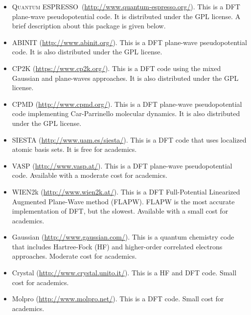 \documentclass[12pt]{article}
\def\QE{\textsc{Quantum ESPRESSO}\xspace}
\begin{document}
    \begin{itemize}

      \item 
      \QE\, (\href{http://www.quantum-espresso.org/}{http://www.quantum-espresso.org/}).
      This is a DFT plane-wave pseudopotential code. It is distributed under the GPL license. A brief description about this package is given below.

      \item
      ABINIT (\href{http://www.abinit.org/}{http://www.abinit.org/}).
      This is a DFT plane-wave pseudopotential code. It is also distributed under the GPL license.

      \item
      CP2K (\href{https://www.cp2k.org/}{https://www.cp2k.org/}).
      This is a DFT code using the mixed Gaussian and plane-waves approaches. It is also distributed under the GPL license.

      \item
      CPMD (\href{http://www.cpmd.org/}{http://www.cpmd.org/}).
      This is a DFT plane-wave pseudopotential code implementing
      Car-Parrinello molecular dynamics.
      It is also distributed under the GPL license.

      \item
      SIESTA (\href{http://www.uam.es/siesta/}{http://www.uam.es/siesta/}).
      This is a DFT code that uses localized atomic basis sets. 
      It is free for academics.

      \item
      VASP (\href{http://www.vasp.at/}{http://www.vasp.at/}).
      This is a DFT plane-wave pseudopotential code. 
      Available with a moderate cost for academics. %

      \item
      WIEN2k (\href{http://www.wien2k.at/}{http://www.wien2k.at/}).
      This is a DFT Full-Potential Linearized Augmented Plane-Wave method (FLAPW).
      FLAPW is the most accurate implementation of DFT, but the slowest.
      Available with  a small cost for academics. %

      \item
      Gaussian (\href{http://www.gaussian.com/}{http://www.gaussian.com/}).
      This is a quantum chemistry code that includes Hartree-Fock (HF) and 
      higher-order correlated electrons approaches.
      Moderate cost for academics. %

      \item
      Crystal (\href{http://www.crystal.unito.it/}{http://www.crystal.unito.it/}).
      This is a HF and DFT code.
      Small cost for academics. %

      \item
      Molpro (\href{http://www.molpro.net/}{http://www.molpro.net/}).
      This is a DFT code.
      Small cost for academics.

    \end{itemize}
\end{document}
